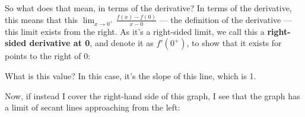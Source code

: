 \documentclass[pdftex, brazil, 12pt, twoside]{article}
\begin{document}
\begin{figure}[H]
  \begin{center}
  \end{center}
\end{figure}

So what does that mean, in terms of the derivative?
In terms of the derivative, this means
that this $\displaystyle \lim_{x \to 0^+}{\frac{f(x) - f(0)}{x-0}}$
--- the definition of the derivative --- this limit
exists from the right. As it's a right-sided limit, we call
this a \textbf{right-sided derivative at 0},
and denote it as $f'(0^+)$,
to show that it exists for points to the right of 0:

\begin{figure}[H]
  \begin{center}
  \end{center}
\end{figure}

What is this value?
In this case, it's the slope of this line, which is 1.

Now, if instead I cover the right-hand side of this graph,
I see that the graph has a limit of secant lines approaching
from the left:
\end{document}
